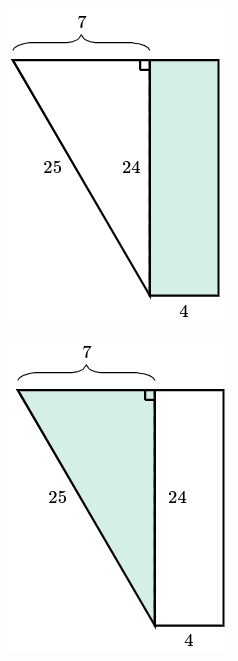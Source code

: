 \begin{solutionbox}{15cm}
\begin{minipage}{0.25\textwidth}
\begin{figure}[H]
            \caption{}
            \label{fig:area_compuesta_05a}
        \end{figure}
        \begin{figure}[H]
            \centering
            \includegraphics[width=0.5\linewidth]{../images/area_compuesta_05b.png}
            \caption{}
            \label{fig:area_compuesta_05b}
        \end{figure}
        \begin{figure}[H]
            \centering
            \includegraphics[width=0.5\linewidth]{../images/area_compuesta_05c.png}
            \caption{}
            \label{fig:area_compuesta_05c}
        \end{figure}
    \end{minipage}

\end{solutionbox}